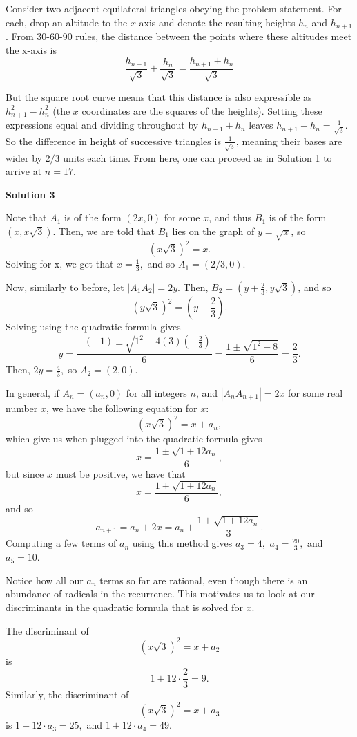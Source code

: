 \begin{enumerate}
Consider two adjacent equilateral triangles obeying the problem statement. For each, drop an altitude to the $x$ axis and denote the resulting heights $h_n$ and $h_{n+1}$. From 30-60-90 rules, the distance between the points where these altitudes meet the x-axis is 
 \[\frac{h_{n+1}}{\sqrt{3}}+\frac{h_n}{\sqrt{3}} = \frac{h_{n+1}+h_n}{\sqrt{3}}\]

 But the square root curve means that this distance is also expressible as $h_{n+1}^2-h_n^2$ (the $x$ coordinates are the squares of the heights). Setting these expressions equal and dividing throughout by $h_{n+1}+h_n$ leaves $h_{n+1}-h_n=\frac{1}{\sqrt{3}}$. So the difference in height of successive triangles is $\frac{1}{\sqrt{3}}$, meaning their bases are wider by $2/3$ units each time. From here, one can proceed as in Solution 1 to arrive at $n=\boxed{17}$.

 



\textbf{Solution 3}

Note that $A_{1}$ is of the form $(2x,0)$ for some $x$, and thus $B_{1}$ is of the form $(x, x \sqrt{3}).$ Then, we are told that $B_{1}$ lies on the graph of $y = \sqrt{x}$, so 
 \[(x \sqrt{3})^{2} = x.\] Solving for x, we get that $x = \frac{1}{3},$ and so $A_{1} = (2/3,0)$. 

 Now, similarly to before, let $|A_{1}A_{2}|=2y.$ Then, $B_{2} = (y+\frac{2}{3},y \sqrt{3})$, and so 
 \[(y \sqrt{3})^{2} = (y+\frac{2}{3}).\]Solving using the quadratic formula gives 
 \[y = \frac{-(-1) \pm \sqrt{1^{2}-4(3)(-\frac{2}{3})}}{6} = \frac{1 \pm \sqrt{1^{2}+8}}{6} = \frac{2}{3}.\]Then, $2y = \frac{4}{3},$ so $A_{2} = (2,0).$

 In general, if $A_{n} = (a_{n},0)$ for all integers $n$, and  $|A_{n}A_{n+1}| = 2x$ for some real number $x$, we have the following equation for $x$:
 \[(x \sqrt{3})^{2} = x+a_{n},\]which give us when plugged into the quadratic formula gives
 \[x = \frac{1 \pm \sqrt{1+12a_{n}}}{6},\]but since $x$ must be positive, we have that
 \[x = \frac{1 + \sqrt{1+12a_{n}}}{6},\]and so 
 \[a_{n+1} = a_{n}+2x = a_{n}+\frac{1 + \sqrt{1+12a_{n}}}{3}.\]Computing a few terms of $a_{n}$ using this method gives $a_{3} = 4,$ $a_{4} = \frac{20}{3},$ and $a_{5} = 10$. 

 Notice how all our $a_{n}$ terms so far are rational, even though there is an abundance of radicals in the recurrence. This motivates us to look at our discriminants in the quadratic formula that is solved for $x$. 

 The discriminant of 
 \[(x \sqrt{3})^{2} = x+a_{2}\] is 
 \[1+12 \cdot \frac{2}{3} = 9.\] Similarly, the discriminant of 
 \[(x \sqrt{3})^{2} = x+a_{3}\] is $1+12 \cdot a_{3} = 25,$ and $1+12 \cdot a_{4} = 49$. 


\end{enumerate}
